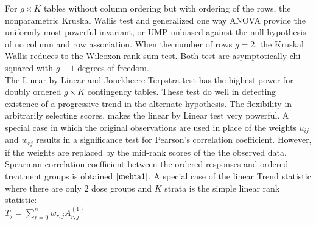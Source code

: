 \documentclass[12pt,oneside]{report}
\theoremstyle{definition}
\theoremstyle{mystyle}
\begin{document}
For $g \times K$ tables without column ordering but  with ordering of the rows, the nonparametric  Kruskal Wallis test  and generalized one way ANOVA provide the uniformly most powerful invariant, or UMP unbiased  against the null hypothesis of no column and row association. When the number of rows $g=2$, the Kruskal Wallis reduces to the Wilcoxon rank sum test. Both test are asymptotically chi-squared with $g-1$ degrees of freedom.\\
The Linear by Linear and Jonckheere-Terpstra test has the highest power for doubly ordered $g \times K$ contingency tables. These test do well in detecting existence of a  progressive trend in the alternate hypothesis. The flexibility in arbitrarily selecting scores, makes the linear by Linear test very powerful. A special case in which the original observations are used in place of the  weights $u_{ij}$ and $w_{rj}$ results in a significance test for  Pearson's correlation coefficient. However, if the weights are replaced by the mid-rank scores of the the observed data, Spearman correlation coefficient between the ordered responses and  ordered treatment groups is obtained $\cite{mehta1}$. 
A  special case of the linear Trend statistic  where there are only 2 dose groups  and  $K$ strata is the simple linear rank statistic: \\

$T_{j}=\sum\limits_{r=0}^{n}w_{r,j}A_{r,j}^{(1)}$
\end{document}
